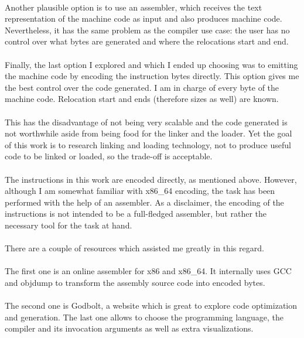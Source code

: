 \documentclass[12pt]{article}
\begin{document}
	\paragraph{}Another plausible option is to use an assembler, which receives the text representation of the machine code as input and also produces machine code. Nevertheless, it has the same problem as the compiler use case: the user has no control over what bytes are generated and where the relocations start and end.
	\paragraph{}Finally, the last option I explored and which I ended up choosing was to emitting the machine code by encoding the instruction bytes directly. This option gives me the best control over the code generated. I am in charge of every byte of the machine code. Relocation start and ends (therefore sizes as well) are known.
	\paragraph{}This has the disadvantage of not being very scalable and the code generated is not worthwhile aside from being food for the linker and the loader. Yet the goal of this work is to research linking and loading technology, not to produce useful code to be linked or loaded, so the trade-off is acceptable.
	\paragraph{}The instructions in this work are encoded directly, as mentioned above. However, although I am somewhat familiar with x86\_64 encoding, the task has been performed with the help of an assembler. As a disclaimer, the encoding of the instructions is not intended to be a full-fledged assembler, but rather the necessary tool for the task at hand.
	\paragraph{}There are a couple of resources which assisted me greatly in this regard.
	\paragraph{}The first one is an online assembler for x86 and x86\_64\cite{online-assembler}. It internally uses GCC and objdump to transform the assembly source code into encoded bytes.
	\paragraph{}The second one is Godbolt, a website which is great to explore code optimization and generation\cite{godbolt}. The last one allows to choose the programming language, the compiler and its invocation arguments as well as extra visualizations.
\end{document}
